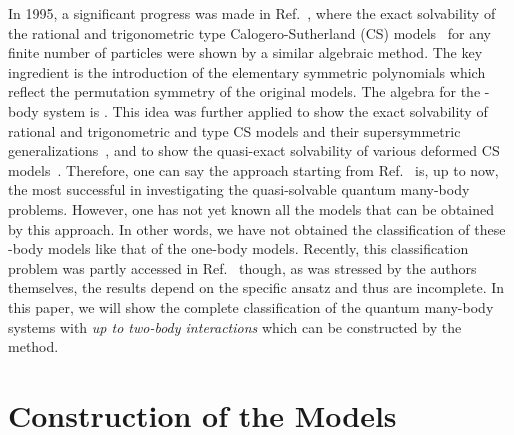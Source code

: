 \documentclass[a4paper,preprint,amsfonts,amssymb,amsmath,%
tightenlines,nofootinbib,noshowpacs]{revtex4}
\providecommand{\Lsl}{\mathfrak{sl}}
\begin{document}
In 1995, a significant progress was made in Ref.~\cite{RuTu1},
where the exact solvability of the rational
and trigonometric \coordHE{} type Calogero-Sutherland (CS)
models~\cite{Calog1,Suthe1,Moser1} for any finite number of
particles were shown by a similar algebraic method. The key
ingredient is the introduction of the elementary symmetric
polynomials which reflect the permutation symmetry
of the original models. The algebra for the \coordHE{}-body system
is \myHighlight{$\Lsl(M+1)$}\coordHE{}. This idea was further applied to
show the exact solvability of rational and trigonometric
\coordHE{} and \coordHE{} type CS models and their supersymmetric
generalizations~\cite{BrTuWy1}, and to show the quasi-exact
solvability of various deformed CS models~\cite{MiRoTu1,HoSh1}.
Therefore, one can say the approach starting from Ref.~\cite{RuTu1}
is, up to now, the most successful in investigating the quasi-solvable
quantum many-body problems. However, one has not yet known all the
models that can be obtained by this approach. In other words, we
have not obtained the classification of these \myHighlight{$\Lsl(M+1)$}\coordHE{}  \coordHE{}-body
models like that of the \myHighlight{$\Lsl(2)$}\coordHE{} one-body models. Recently, this
classification problem was partly accessed in Ref.~\cite{UlLoRo1}
though, as was stressed by the authors themselves, the results depend
on the specific ansatz and thus are incomplete.
In this paper, we will show the complete classification of the
quantum many-body systems with \textit{up to two-body interactions}
which can be constructed by the \myHighlight{$\Lsl(M+1)$}\coordHE{} method.

\section{\label{sec:const}Construction of the Models}
\end{document}
